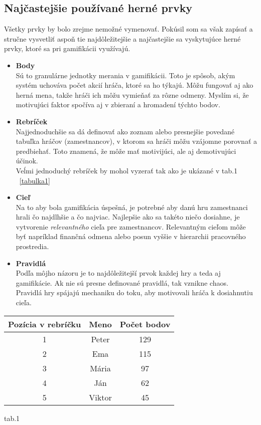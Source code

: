 \documentclass{article}
\begin{document}
\subsection{Najčastejšie používané herné prvky} 
Všetky prvky by bolo zrejme nemožné vymenovať. Pokúsil som sa však zapísať a stručne vysvetliť aspoň tie najdôležitejšie a najčastejšie sa vyskytujúce herné prvky, ktoré sa pri gamifikácii využívajú.
\begin{itemize}
\item \textbf{Body} \\
Sú to granulárne jednotky merania v gamifikácii. Toto je spôsob, akým systém uchováva počet akcií hráča, ktoré sa ho týkajú\cite{10.1007/978-3-642-39241-2_58}. Môžu fungovať aj ako herná mena, takže hráči ich môžu vymieňať za rôzne odmeny. Myslím si, že motivujúci faktor spočíva aj v zbieraní a hromadení týchto bodov.
\item \textbf{Rebríček} \\
Najjednoduchšie sa dá definovať ako zoznam alebo presnejšie povedané tabuľka hráčov (zamestnancov), v ktorom sa hráči môžu vzájomne porovnať a predbiehať. Toto znamená, že môže mať motivijúci, ale aj demotivujúci účinok.
\\Veĺmi jednoduchý rebríček by mohol vyzerať tak ako je ukázané v tab.1 ~\ref{tabulka1}
\item \textbf{Cieľ} \\
Na to aby bola gamifikácia úspešná, je potrebné aby danú hru zamestnanci hrali čo najdlhšie a čo najviac. Najlepšie ako sa takéto niečo dosiahne, je vytvorenie \textit{relevantného} cieľa pre zamestnancov. Relevantným cieľom môže byť napríklad finančná odmena alebo posun vyššie v hierarchii pracovného prostredia.
\item \textbf{Pravidlá}\\
Podľa môjho názoru je to najdôležitejší prvok každej hry a teda aj gamifikácie. Ak nie sú presne definované pravidlá, tak vznikne chaos.
\\Pravidlá hry spájajú mechaniku do toku, aby motivovali hráča k dosiahnutiu cieľa\cite{10.1007/978-3-642-39241-2_58}.
\end{itemize}
\vspace{0.5cm}

\begin{center}
\begin{tabular}{|c c c|} 
 \hline
 Pozícia v rebríčku & Meno & Počet bodov \\ [0.5ex] 
 \hline\hline
 1 & Peter & 129 \\ 
 \hline
 2 & Ema & 115 \\
 \hline
 3 & Mária & 97 \\
 \hline
 4 & Ján & 62 \\
 \hline
 5 & Viktor & 45 \\ [1ex] 
 \hline
\end{tabular}
\vspace{0.5cm}

\label{tabulka1}
tab.1
\end{center}
\end{document}
